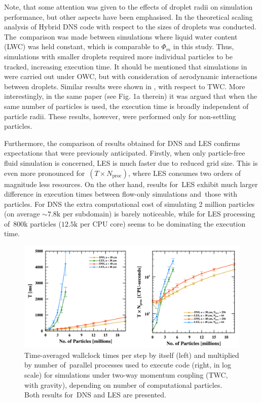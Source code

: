 \documentclass{pracamgren}
\begin{document}
Note, that some attention was given to the effects of droplet radii on simulation performance, but other aspects have been emphasised.
In \textcite[Fig. 8c]{Ayala2014} the theoretical scaling analysis of Hybrid DNS code with respect to the sizes of droplets was conducted.
The~comparison was made between simulations where liquid water content (LWC) was held constant, which is comparable to $\Phi_m$ in this study.
Thus, simulations with smaller droplets required more individual particles to be tracked, increasing execution time.
It should be mentioned that simulations in \parencite{Ayala2014} were carried out under OWC, but with consideration of aerodynamic interactions between droplets. 
Similar results were shown in \textcite[Fig. 1b]{Rosa2022}, with respect to TWC.
More interestingly, in the same paper (see Fig. 1a therein) it was argued that when the same number of particles is used, the execution time is broadly independent of particle radii.
These results, however, were performed only for non-settling particles.

Furthermore, the comparison of results obtained for DNS and LES confirms expectations that were previously anticipated.
Firstly, when only particle-free fluid simulation is concerned, LES is much faster due to reduced grid size.
This is even more pronounced for~$(T \times N_{\text{proc}})$, where LES consumes two orders of magnitude less resources.
On the other hand, results for~LES exhibit much larger difference in execution times between flow-only simulations and~those with particles.
For DNS the extra computational cost of simulating 2 million particles (on average $\sim 7.8\text{k}$ per subdomain) is barely noticeable, while for LES processing of~800k particles ($12.5\text{k}$ per CPU core) seems to be dominating the execution time. 

\begin{figure}[h]
\centering
\includegraphics[width=13.5cm]{img/plots/3-2b-pfstwc.pdf}
\caption{
Time-averaged wallclock times per step by itself (left) and multiplied by number of~parallel processes used to execute code (right, in log scale) for simulations under two-way momentum coupling (TWC, with gravity), depending on number of computational particles. Both results for~DNS and LES are presented.
}
\label{fig:pfstwc}
\end{figure}
\end{document}
